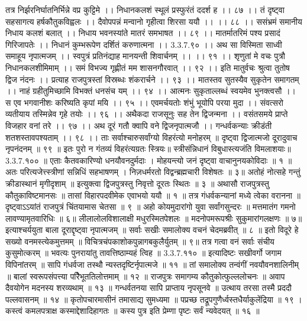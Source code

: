 तत्र निर्झरनिर्घातनिर्भिन्ने वप्र कुट्टिमे ।।
निधानकलशं स्थूलं प्रस्फुरंतं ददर्श ह ।। ८७ ।।
तं दृष्ट्वा सहसागत्य हर्षकौतुकविह्वलः ।।
दैवोपपन्नं मन्वानो गृहीत्वा शिरसा ययौ ।। ।। ८८ ।।
ससंभ्रमं समानीय निधाय कलशं बलात् ।।
निधाय भवनस्यांते मातरं समभाषत ।। ८९ ।।
मातर्मातरिमं पश्य प्रसादं गिरिजापतेः ।।
निधानं कुम्भरूपेण दर्शितं करुणात्मना ।। 3.3.7.९० ।।
अथ सा विस्मिता साध्वी समाहूय नृपात्मजम् ।।
स्वपुत्रं प्रतिनंद्याह मानयन्ती शिवार्चनम् ।। ।। ९१ ।।
शृणुतां मे वचः पुत्रौ निधानकलशीमिमाम् ।।
समं विभज्य गृह्णीतं मम शासनगौरवात् ।। ९२ ।।
इति मातुर्वचः श्रुत्वा तुतोष द्विज नंदनः ।।
प्रत्याह राजपुत्रस्तां विस्रब्धः शंकरार्चने ।। ९३ ।।
मातस्तव सुतस्यैव सुकृतेन समागतम् ।।
नाहं ग्रहीतुमिच्छामि विभक्तं धनसंच यम् ।। ९४ ।।
आत्मनः सुकृताल्लब्धं स्वयमेव भुनक्त्वसौ ।।
स एव भगवानीशः करिष्यति कृपां मयि ।। ९५ ।।
एवमर्चयतोः शंभुं भूयोपि परया मुदा ।।
संवत्सरो व्यतीयाय तस्मिन्नेव गृहे तयोः ।। ९६ ।।
अथैकदा राजसूनुः सह तेन द्विजन्मना ।।
वसंतसमये प्राप्ते विजहार वनां तरे ।। ९७ ।।
अथ दूरं गतौ क्वापि वने द्विजनृपात्मजौ ।।
गन्धर्वकन्याः क्रीडंती शतशस्तावपश्यताम् ।। ९८ ।।
ताः सर्वाश्चारुसर्वांग्यो विहरंत्यो मनोहरम् ॥
दृष्ट्वा द्विजात्मजो दूरादुवाच नृपनंदनम् ॥ ९९ ॥
इतः पुरो न गंतव्यं विहरंत्यग्रतः स्त्रियः॥
स्त्रीसंन्निधानं विबुधास्त्यजंति विमलाशयाः॥ 3.3.7.१०० ॥
एताः कैतवकारिण्यो धनयौवनदुर्मदाः ।
मोहयन्त्यो जनं दृष्ट्वा वाचानुनयकोविदाः ॥ १ ॥
अतः परित्यजेत्त्स्त्रीणां सन्निधिं सहभाषणम् ।
निज़धर्मरतो विद्वन्ब्रह्मचारी विशेषतः ॥ ३॥
अतोहं नोत्सहे गन्तुं क्रीडास्थानं मृगीदृशाम् ॥
इत्युक्त्वा द्विजपुत्रस्तु निवृत्तो दूरतः स्थितः ॥ ३ ॥
अथासौ राजपुत्रस्तु कौतुकाविष्टमानसः ॥
तासां विहारपदवीमेक एवाभयो ययौ ॥ १ ॥
तत्र गंधर्वकन्यानां मध्ये त्वेका वरानना ॥
दृष्ट्वाऽऽयांतं राजपुत्रं चिंतयामास चेतसा ॥ ९ ॥
अहो कोयमुदारांगो युवा सर्वांगसुन्दरः ॥
मत्तमातंग गमनो लावण्यामृतवारिधिः ॥ ६॥
लीलालोलविशालाक्षी मधुरस्मितपेशलः ॥
मदनोपमरूपश्रीः सुकुमारांगलक्षणः ॥ ७॥
इत्याश्चर्ययुता बाला दूराद्दृष्ट्वा नृपात्मजम् ॥
सर्वाः सखीः समालोक्य वचनं चेदमब्रवीत् ॥ ८ ॥
इतो विदूरे हे सख्यो वनमस्त्येकमुत्तमम् ॥
विचित्रचंपकाशोकपुन्नागबकुलैर्युतम् ॥ ९॥
तत्र गत्वा वनं सर्वाः संचीय कुसुमोत्करम् ॥
भवत्यः पुनरायांतु तावत्तिष्ठाम्यहं त्विह ॥ 3.3.7.११० ॥
इत्यादिष्टः सखीवर्गो जगाम विपिनांतरम् ॥
सापि गंधर्वजा तस्थौ न्यस्तदृष्टिर्नृपात्मजे ॥ ११ ॥
तां समालोक्य तन्वंगीं नवयौवनशालिनीम् ॥
बालां स्वरूपसंपत्त्या परैिभूततिलोत्तमाम् ॥ १२ ॥
राजपुत्रः समागम्य कौतुकोत्फुल्ललोचनः ॥
अवाप दैवयोगेन मदनस्य शरव्यथाम् ॥ १३ ॥
गन्धर्वतनया सापि प्राप्ताय नृपसूनवे ॥
उत्थाय तरसा तस्मै प्रददौ पल्लवासनम् ॥ १४ ॥
कृतोपचारमासीनं तमासाद्य सुमध्यमा ॥
पप्रच्छ तद्रूपगुणैर्ध्वस्तधैर्याकुलेंद्रिया ॥ १९ ।
कस्त्वं कमलपत्राक्ष कस्माद्देशादिहागतः ॥
कस्य पुत्र इति प्रेम्णा पृष्टः सर्वं न्यवेदयत् ॥ १६ ॥
